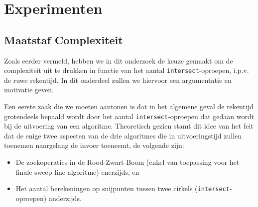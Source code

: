 \documentclass[12pt]{article}
\begin{document}


\section{Experimenten}
\subsection{Maatstaf Complexiteit}
Zoals eerder vermeld, hebben we in dit onderzoek de keuze gemaakt om de complexiteit uit te drukken in functie van het aantal \texttt{intersect}-oproepen, i.p.v. de ruwe rekentijd. In dit onderdeel zullen we hiervoor een argumentatie en motivatie geven.

Een eerste zaak die we moeten aantonen is dat in het algemene geval de rekentijd grotendeels bepaald wordt door het aantal \texttt{intersect}-oproepen dat gedaan wordt bij de uitvoering van een algoritme. Theoretisch gezien stamt dit idee van het feit dat de enige twee aspecten van de drie algoritmes die in uitvoeringstijd zullen toenemen naargelang de invoer toeneemt, de volgende zijn:
\begin{itemize}
\item  De zoekoperaties in de Rood-Zwart-Boom (enkel van toepassing voor het finale sweep line-algoritme) enerzijds, en
\item  Het aantal berekeningen op snijpunten tussen twee cirkels (\texttt{intersect}-oproepen) anderzijds.
\end{itemize}
\end{document}
